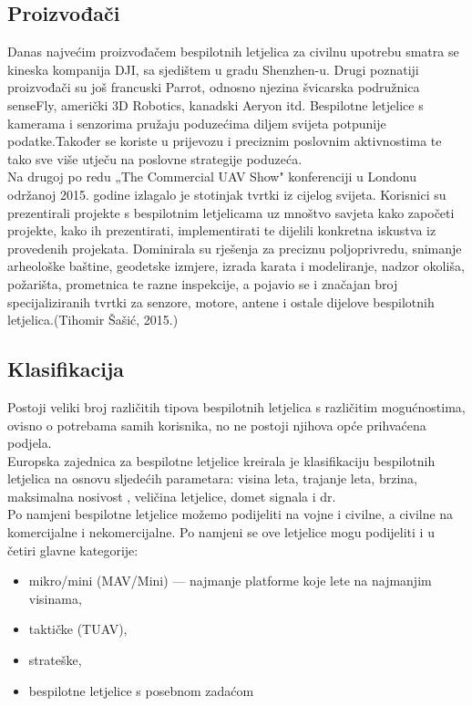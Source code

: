 \documentclass[times, utf8, diplomski]{fer}
\begin{document}
\subsection{Proizvođači}
Danas  najvećim  proizvođačem  bespilotnih  letjelica  za  civilnu  upotrebu  smatra  se kineska kompanija DJI, sa sjedištem u gradu Shenzhen-u. Drugi poznatiji proizvođači su još francuski  Parrot,  odnosno njezina  švicarska  podružnica  senseFly,  američki  3D  Robotics,  kanadski  Aeryon itd.
Bespilotne letjelice  s  kamerama  i  senzorima pružaju poduzećima  diljem  svijeta potpunije podatke.Također se koriste u prijevozu i preciznim poslovnim aktivnostima te tako sve više utječu na poslovne strategije poduzeća.\\
Na  drugoj  po  redu  „The  Commercial  UAV  Show"  konferenciji  u  Londonu održanoj 2015. godine izlagalo je  stotinjak tvrtki iz cijelog svijeta. Korisnici su prezentirali projekte s bespilotnim  letjelicama  uz  mnoštvo  savjeta  kako  započeti  projekte,  kako  ih  prezentirati, implementirati te dijelili konkretna iskustva iz provedenih projekata. Dominirala su rješenja za preciznu  poljoprivredu,  snimanje  arheološke  baštine,  geodetske  izmjere,  izrada  karata  i modeliranje, nadzor okoliša, požarišta, prometnica te razne inspekcije, a pojavio se i značajan broj  specijaliziranih  tvrtki  za  senzore,  motore,  antene  i  ostale  dijelove  bespilotnih  letjelica.(Tihomir Šašić, 2015.)

\subsection{Klasifikacija}
Postoji  veliki  broj  različitih  tipova  bespilotnih  letjelica  s  različitim  mogućnostima, ovisno o potrebama samih korisnika, no ne postoji njihova opće prihvaćena podjela.\\
Europska  zajednica  za  bespilotne  letjelice   kreirala je klasifikaciju bespilotnih letjelica na osnovu sljedećih parametara:  visina  leta,  trajanje  leta,  brzina,  maksimalna  nosivost  , veličina letjelice, domet signala i dr. \\
Po  namjeni  bespilotne  letjelice
možemo  podijeliti  na  vojne  i  civilne,  a  civilne  na komercijalne i nekomercijalne. Po namjeni se ove letjelice mogu podijeliti i u četiri glavne kategorije:\begin{itemize}
\item mikro/mini (MAV/Mini) --- najmanje platforme koje lete na najmanjim visinama,
\item taktičke (TUAV),
\item strateške,
\item bespilotne letjelice s posebnom zadaćom
\end{itemize}
\end{document}
